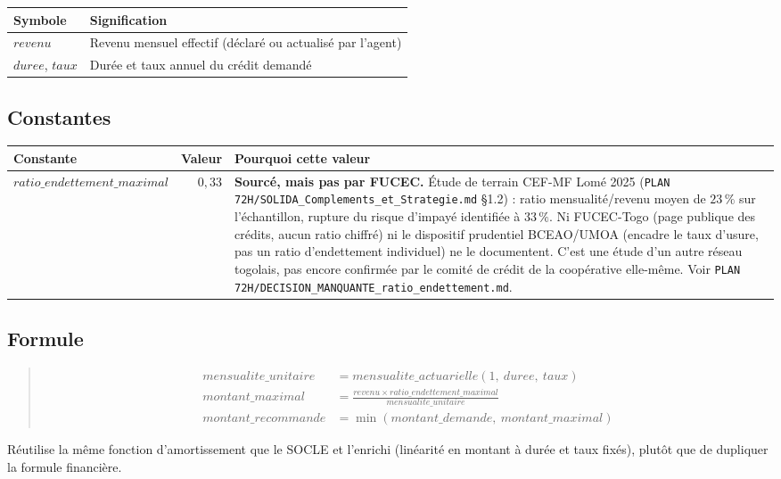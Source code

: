 \documentclass[11pt,a4paper]{article}
\newcommand{\brk}{\allowbreak}
\newenvironment{formule}{\begin{quote}}{\end{quote}}
\begin{document}
\begin{tabular}{@{}lL{9.5cm}@{}}
\toprule
Symbole & Signification \\
\midrule
$\mathit{revenu}$ & Revenu mensuel effectif (déclaré ou actualisé par l'agent) \\
$\mathit{duree}$, $\mathit{taux}$ & Durée et taux annuel du crédit demandé \\
\bottomrule
\end{tabular}

\subsection*{Constantes}

\begin{tabular}{@{}L{3.2cm}rL{7.4cm}@{}}
\toprule
Constante & Valeur & Pourquoi cette valeur \\
\midrule
$\mathit{ratio\_endettement\_maximal}$ & $0{,}33$ & \textbf{Sourcé, mais pas par FUCEC.} Étude de
  terrain CEF-MF Lomé 2025 (\texttt{PLAN 72H/\brk SOLIDA\_Complements\_et\_Strategie.md} §1.2) :
  ratio mensualité/revenu moyen de $23\,\%$ sur l'échantillon, rupture du risque d'impayé
  identifiée à $33\,\%$. Ni FUCEC-Togo (page publique des crédits, aucun ratio chiffré) ni le
  dispositif prudentiel BCEAO/UMOA (encadre le taux d'usure, pas un ratio d'endettement
  individuel) ne le documentent. C'est une étude d'un autre réseau togolais, pas encore confirmée
  par le comité de crédit de la coopérative elle-même. Voir
  \texttt{PLAN 72H/\brk DECISION\_MANQUANTE\_ratio\_endettement.md}. \\
\bottomrule
\end{tabular}

\subsection*{Formule}
\begin{formule}
\begin{align}
\mathit{mensualite\_unitaire} &= \mathit{mensualite\_actuarielle}(1,\ \mathit{duree},\ \mathit{taux}) \\
\mathit{montant\_maximal} &= \frac{\mathit{revenu} \times \mathit{ratio\_endettement\_maximal}}{\mathit{mensualite\_unitaire}} \\
\mathit{montant\_recommande} &= \min(\mathit{montant\_demande},\ \mathit{montant\_maximal})
\end{align}
\end{formule}
Réutilise la même fonction d'amortissement que le SOCLE et l'enrichi (linéarité en montant à
durée et taux fixés), plutôt que de dupliquer la formule financière.
\end{document}
